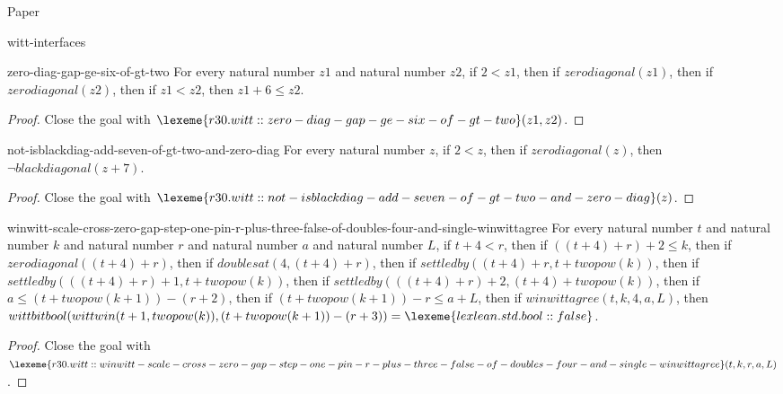 \begin{lexlean}{Paper}
\begin{section}{witt-interfaces}
  \begin{theorem}{zero-diag-gap-ge-six-of-gt-two}
  For every natural number \(z1\) and natural number \(z2\), if \(2 < z1\), then if \(zerodiagonal(z1)\), then if \(zerodiagonal(z2)\), then if \(z1 < z2\), then \(z1 + 6 ≤ z2\).
  \begin{proof}
  Close the goal with \(\lexeme{r30.witt::zero-diag-gap-ge-six-of-gt-two}(z1, z2)\).
  \end{proof}
  \end{theorem}

  \begin{theorem}{not-isblackdiag-add-seven-of-gt-two-and-zero-diag}
  For every natural number \(z\), if \(2 < z\), then if \(zerodiagonal(z)\), then \(¬ blackdiagonal(z + 7)\).
  \begin{proof}
  Close the goal with \(\lexeme{r30.witt::not-isblackdiag-add-seven-of-gt-two-and-zero-diag}(z)\).
  \end{proof}
  \end{theorem}

  \begin{theorem}{winwitt-scale-cross-zero-gap-step-one-pin-r-plus-three-false-of-doubles-four-and-single-winwittagree}
  For every natural number \(t\) and natural number \(k\) and natural number \(r\) and natural number \(a\) and natural number \(L\), if \(t + 4 < r\), then if \(((t + 4) + r) + 2 ≤ k\), then if \(zerodiagonal((t + 4) + r)\), then if \(doublesat(4, (t + 4) + r)\), then if \(settledby((t + 4) + r, t + twopow(k))\), then if \(settledby(((t + 4) + r) + 1, t + twopow(k))\), then if \(settledby(((t + 4) + r) + 2, (t + 4) + twopow(k))\), then if \(a ≤ (t + twopow(k + 1)) - (r + 2)\), then if \((t + twopow(k + 1)) - r ≤ a + L\), then if \(winwittagree(t, k, 4, a, L)\), then \(wittbitbool(wittwin(t + 1, twopow(k)), (t + twopow(k + 1)) - (r + 3)) = \lexeme{lexlean.std.bool::false}\).
  \begin{proof}
  Close the goal with \(\lexeme{r30.witt::winwitt-scale-cross-zero-gap-step-one-pin-r-plus-three-false-of-doubles-four-and-single-winwittagree}(t, k, r, a, L)\).
  \end{proof}
  \end{theorem}


\end{section}
\end{lexlean}
